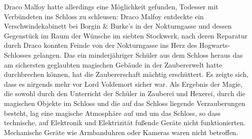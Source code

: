 \documentclass[a4paper, 10pt]{article}
\begin{document}
\vspace{10pt}
\newline
Draco Malfoy hatte allerdings eine Möglichkeit gefunden, Todesser mit Verbündeten ins Schloss zu schleusen: Draco Malfoy entdeckte ein Verschwindekabinett bei Borgin & Burke's in der Nokturngasse und dessen Gegenstück im Raum der Wünsche im siebten Stockwerk, nach deren Reparatur durch Draco konnten Feinde von der Nokturngasse ins Herz des Hogwarts-Schlosses gelangen. Das ein minderjähriger Schüler aus dem Schloss heraus das am sichersten geglaubten magischen Gebäude in der Zaubererwelt hatte durchbrechen können, hat die Zaubererschaft mächtig erschüttert. Es zeigte sich, dass es nirgends mehr vor Lord Voldemort sicher war.
\vspace{10pt}
\newline
Als Ergebnis der Magie, die sowohl durch den Unterricht der Schüler in Zauberei und Hexerei, durch die magischen Objekte im Schloss und die auf das Schloss liegende Verzauberungen besteht, lag eine magische Atmosphäre auf und um das Schloss, so dass technische, auf Elektronik und Elektrizität fußende Geräte nicht funktionierten. Mechanische Geräte wie Armbanduhren oder Kameras waren nicht betroffen. 
\vspace{10pt}
\newline
\end{document}
